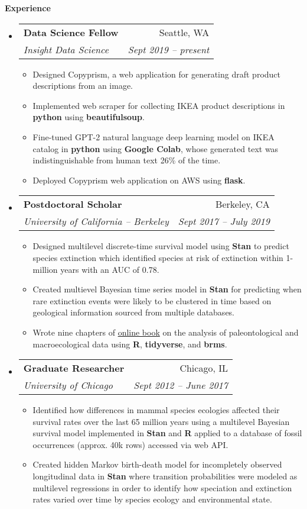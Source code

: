 \documentclass[letterpaper,11pt]{article}
\makeatletter
\newcommand{\resitem}[1]{\item #1 \vspace{-2pt}}
\newcommand{\resheading}[1]{
  {\large \colorbox{mygrey}{\begin{minipage}{\textwidth}{\textbf{#1 \vphantom{p\^{E}}}}\end{minipage}}}
}
\newcommand{\ressubheading}[4]{
  \begin{tabular*}{6.5in}{l@{\extracolsep{\fill}}r}
    \textbf{#1} & #2 \\
    \textit{#3} & \textit{#4} \\
\end{tabular*}\vspace{-6pt}}
\makeatother
\begin{document}
\resheading{Experience}
\begin{itemize}[itemsep=0mm]
  \item 
    \ressubheading{Data Science Fellow}{Seattle, WA}{Insight Data Science}{Sept 2019 -- present}
    { %
      \begin{itemize}
          \resitem{Designed Copyprism, a web application for generating draft product descriptions from an image.}
          \resitem{Implemented web scraper for collecting IKEA product descriptions in \textbf{python} using \textbf{beautifulsoup}.}
          \resitem{Fine-tuned GPT-2 natural language deep learning model on IKEA catalog in \textbf{python} using \textbf{Google Colab}, whose generated text was indistinguishable from human text 26\% of the time.}
          \resitem{Deployed Copyprism web application on AWS using \textbf{flask}.}
      \end{itemize}
    }
  \item 
    \ressubheading{Postdoctoral Scholar}{Berkeley, CA}{University of California -- Berkeley}{Sept 2017 -- July 2019}
    { %
      \begin{itemize}
          \resitem{Designed multilevel discrete-time survival model using \textbf{Stan} to predict species extinction which identified species at risk of extinction within 1-million years with an AUC of 0.78.}
          \resitem{Created multievel Bayesian time series model in \textbf{Stan} for predicting when rare extinction events were likely to be clustered in time based on geological information sourced from multiple databases.}
          \resitem{Wrote nine chapters of \href{https://psmits.github.io/paleo_book/index.html}{online book} on the analysis of paleontological and macroecological data using \textbf{R}, \textbf{tidyverse}, and \textbf{brms}.}
      \end{itemize}
    }
  \item 
    \ressubheading{Graduate Researcher}{Chicago, IL}{University of Chicago}{Sept 2012 -- June 2017}
    { %
      \begin{itemize}
          \resitem{Identified how differences in mammal species ecologies affected their survival rates over the last 65 million years using a multilevel Bayesian survival model implemented in \textbf{Stan} and \textbf{R} applied to a database of fossil occurrences (approx. 40k rows) accessed via web API.}
          \resitem{Created hidden Markov birth-death model for incompletely observed longitudinal data in \textbf{Stan} where transition probabilities were modeled as multilevel regressions in order to identify how speciation and extinction rates varied over time by species ecology and environmental state.}

\end{itemize}}
\end{itemize}
\end{document}
